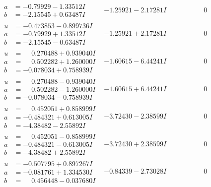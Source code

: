 \documentclass[1p]{elsarticle_modified}
\theoremstyle{definition}
\begin{document}
$$\begin{array}{c|c|c}
\begin{aligned}
a &= -0.79929 - 1.33512 I \\
b &= -2.15545 + 0.63487 I\end{aligned}
 & -1.25921 - 2.17281 I & \phantom{-0.000000 } 0 \\ \hline\begin{aligned}
u &= -0.473853 - 0.899736 I \\
a &= -0.79929 + 1.33512 I \\
b &= -2.15545 - 0.63487 I\end{aligned}
 & -1.25921 + 2.17281 I & \phantom{-0.000000 } 0 \\ \hline\begin{aligned}
u &= \phantom{-}0.270488 + 0.939040 I \\
a &= \phantom{-}0.502282 + 1.260000 I \\
b &= -0.078034 + 0.758939 I\end{aligned}
 & -1.60615 - 6.44241 I & \phantom{-0.000000 } 0 \\ \hline\begin{aligned}
u &= \phantom{-}0.270488 - 0.939040 I \\
a &= \phantom{-}0.502282 - 1.260000 I \\
b &= -0.078034 - 0.758939 I\end{aligned}
 & -1.60615 + 6.44241 I & \phantom{-0.000000 } 0 \\ \hline\begin{aligned}
u &= \phantom{-}0.452051 + 0.858999 I \\
a &= -0.484321 + 0.613005 I \\
b &= -4.38482 - 2.55892 I\end{aligned}
 & -3.72430 - 2.38599 I & \phantom{-0.000000 } 0 \\ \hline\begin{aligned}
u &= \phantom{-}0.452051 - 0.858999 I \\
a &= -0.484321 - 0.613005 I \\
b &= -4.38482 + 2.55892 I\end{aligned}
 & -3.72430 + 2.38599 I & \phantom{-0.000000 } 0 \\ \hline\begin{aligned}
u &= -0.507795 + 0.897267 I \\
a &= -0.081761 + 1.334530 I \\
b &= \phantom{-}0.456448 - 0.037680 I\end{aligned}
 & -0.84339 - 2.73028 I & \phantom{-0.000000 } 0 \\ \hline\begin{aligned}

\end{aligned}
\end{array}$$
\end{document}

